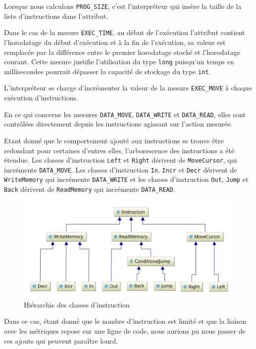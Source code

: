 \documentclass{article}
\begin{document}
    Lorsque nous calculons \texttt{PROG\_SIZE}, c'est l'interpréteur qui insère la taille de la liste d'instructions dans l'attribut.


    Dans le cas de la mesure \texttt{EXEC\_TIME}, au début de l'exécution l'attribut contient l'horodatage du début d'exécution et à la fin de l'exécution, sa valeur est remplacée par la différence entre le premier horodatage stocké et l'horodatage courant. Cette mesure justifie l'utilisation du type \texttt{long} puisqu'un temps en millisecondes pourrait dépasser la capacité de stockage du type \texttt{int}.


     L'interpréteur se charge d'incrémenter la valeur de la mesure  \texttt{EXEC\_MOVE} à chaque exécution d'instructions.


    En ce qui concerne les mesures \texttt{DATA\_MOVE}, \texttt{DATA\_WRITE} et \texttt{DATA\_READ}, elles sont contrôlées directement depuis les instructions agissant sur l'action mesurée.


    Etant donné que le comportement ajouté aux instructions se trouve être redondant pour certaines d'entres elles, l'arborescence des instructions a été étendue. Les classes d'instruction \texttt{Left} et \texttt{Right} dérivent de \texttt{MoveCursor}, qui incrémente \texttt{DATA\_MOVE}. Les classes d'instruction \texttt{In}, \texttt{Incr} et \texttt{Decr} dérivent de \texttt{WriteMemory} qui incrémente \texttt{DATA\_WRITE} et les classes d'instruction \texttt{Out}, \texttt{Jump} et \texttt{Back} dérivent de \texttt{ReadMemory} qui incrémente \texttt{DATA\_READ}.

\begin{figure}[!hb]
        \centering
        \includegraphics[scale=0.6]{svgL3/instructions}
        \caption{Hiérarchie des classes d'instruction}
\end{figure}


    Dans ce cas, étant donné que le nombre d'instruction est limité et que la liaison avec les métriques repose sur une ligne de code, nous aurions pu nous passer de ces ajouts qui peuvent paraître lourd.
\end{document}
